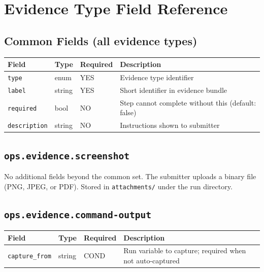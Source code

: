\section{Evidence Type Field Reference}
\label{sec:ref-evidence}

\subsection{Common Fields (all evidence types)}

\begin{center}
\small
\begin{tabular}{lllp{5cm}}
\textbf{Field} & \textbf{Type} & \textbf{Required} & \textbf{Description} \\
\hline
\texttt{type} & enum & YES & Evidence type identifier \\
\texttt{label} & string & YES & Short identifier in evidence bundle \\
\texttt{required} & bool & NO & Step cannot complete without this (default: false) \\
\texttt{description} & string & NO & Instructions shown to submitter \\
\end{tabular}
\end{center}

\subsection{\texttt{ops.evidence.screenshot}}

No additional fields beyond the common set. The submitter uploads a binary file (PNG, JPEG,
or PDF). Stored in \texttt{attachments/} under the run directory.

\subsection{\texttt{ops.evidence.command-output}}

\begin{center}
\small
\begin{tabular}{lllp{5cm}}
\textbf{Field} & \textbf{Type} & \textbf{Required} & \textbf{Description} \\
\hline
\texttt{capture\_from} & string & COND & Run variable to capture; required when not auto-captured \\
\end{tabular}
\end{center}

